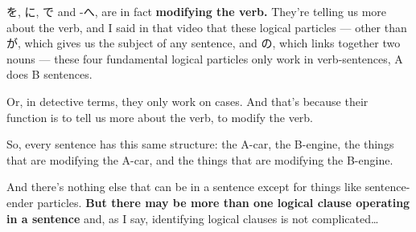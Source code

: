 {}

を, に, で and -へ, are in fact {\bf modifying the verb.} They're telling us more about the verb, and I said in that video that these logical particles --- other than が, which gives us the subject of any sentence, and の, which links together two nouns --- these four fundamental logical particles only work in verb-sentences, A does B sentences.

Or, in detective terms, they only work on cases. And that's because their function is to tell us more about the verb, to modify the verb.

So, every sentence has this same structure: the A-car, the B-engine, the things that are modifying the A-car, and the things that are modifying the B-engine.

{}

And there's nothing else that can be in a sentence except for things like sentence-ender particles. {\bf But there may be more than one logical clause operating in a sentence} and, as I say, identifying logical clauses is not complicated\ldots{}

\stopsectionlevel
